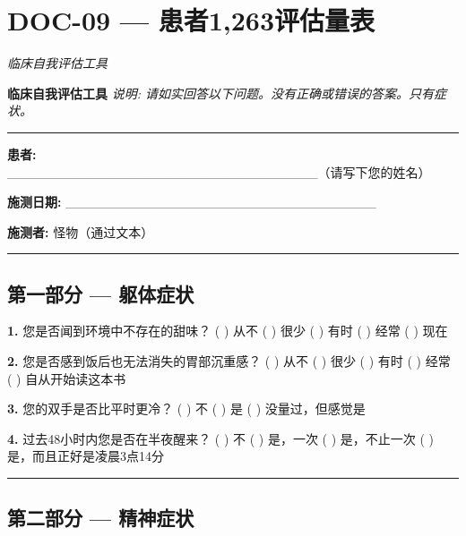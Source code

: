 \section*{\textbf{DOC-09} --- 患者1,263评估量表}

\noindent \textit{临床自我评估工具}

\noindent \textbf{临床自我评估工具}
\noindent \textit{说明: 请如实回答以下问题。没有正确或错误的答案。只有症状。}

\vspace{0.5em}\noindent\rule{\textwidth}{0.5pt}\vspace{0.5em}

\noindent \textbf{患者:} \_\_\_\_\_\_\_\_\_\_\_\_\_\_\_\_\_\_\_\_\_\_\_\_\_\_\_\_\_\_\_\_\_（请写下您的姓名）

\noindent \textbf{施测日期:} \_\_\_\_\_\_\_\_\_\_\_\_\_\_\_\_\_\_\_\_\_\_\_\_\_\_\_\_\_\_\_\_\_

\noindent \textbf{施测者:} 怪物（通过文本）

\vspace{0.5em}\noindent\rule{\textwidth}{0.5pt}\vspace{0.5em}

\subsection*{第一部分 --- 躯体症状}

\noindent \textbf{1.} 您是否闻到环境中不存在的甜味？
( ) 从不
( ) 很少
( ) 有时
( ) 经常
( ) 现在

\noindent \textbf{2.} 您是否感到饭后也无法消失的胃部沉重感？
( ) 从不
( ) 很少
( ) 有时
( ) 经常
( ) 自从开始读这本书

\noindent \textbf{3.} 您的双手是否比平时更冷？
( ) 不
( ) 是
( ) 没量过，但感觉是

\noindent \textbf{4.} 过去48小时内您是否在半夜醒来？
( ) 不
( ) 是，一次
( ) 是，不止一次
( ) 是，而且正好是凌晨3点14分

\vspace{0.5em}\noindent\rule{\textwidth}{0.5pt}\vspace{0.5em}

\subsection*{第二部分 --- 精神症状}

